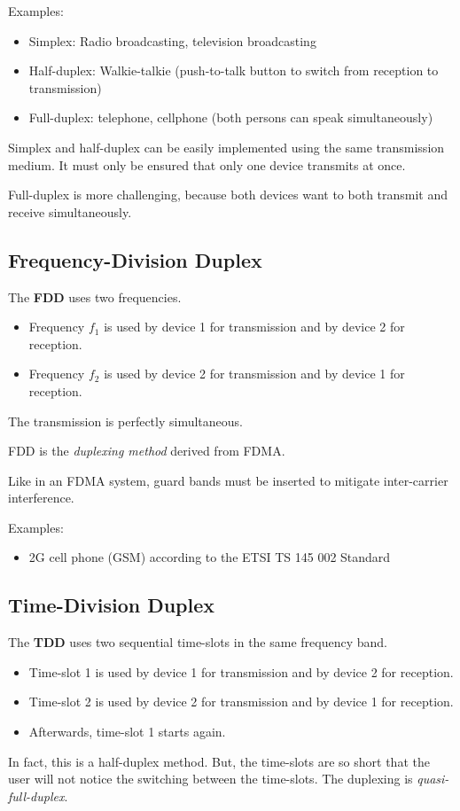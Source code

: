 \begin{refsection}
Examples:
\begin{itemize}
	\item Simplex: Radio broadcasting, television broadcasting
	\item Half-duplex: Walkie-talkie (push-to-talk button to switch from reception to transmission)
	\item Full-duplex: telephone, cellphone (both persons can speak simultaneously)
\end{itemize}

Simplex and half-duplex can be easily implemented using the same transmission medium. It must only be ensured that only one device transmits at once.

Full-duplex is more challenging, because both devices want to both transmit and receive simultaneously.

\subsection{Frequency-Division Duplex}

The  \textbf{\acf{FDD}} uses two frequencies.
\begin{itemize}
	\item Frequency $f_1$ is used by device 1 for transmission and by device 2 for reception.
	\item Frequency $f_2$ is used by device 2 for transmission and by device 1 for reception.
\end{itemize}
The transmission is perfectly simultaneous.

\ac{FDD} is the \emph{duplexing method} derived from \ac{FDMA}.

\begin{remark}
	Like in an \ac{FDMA} system, guard bands must be inserted to mitigate inter-carrier interference.
\end{remark}

Examples:
\begin{itemize}
	\item 2G cell phone (\acs{GSM}) according to the \acs{ETSI} TS 145 002 Standard \cite{etsits145002}
\end{itemize}

\subsection{Time-Division Duplex}

The  \textbf{\acf{TDD}} uses two sequential time-slots in the same frequency band.
\begin{itemize}
	\item Time-slot 1 is used by device 1 for transmission and by device 2 for reception.
	\item Time-slot 2 is used by device 2 for transmission and by device 1 for reception.
	\item Afterwards, time-slot 1 starts again.
\end{itemize}
In fact, this is a half-duplex method. But, the time-slots are so short that the user will not notice the switching between the time-slots. The duplexing is \emph{quasi-full-duplex}.


\end{refsection}
